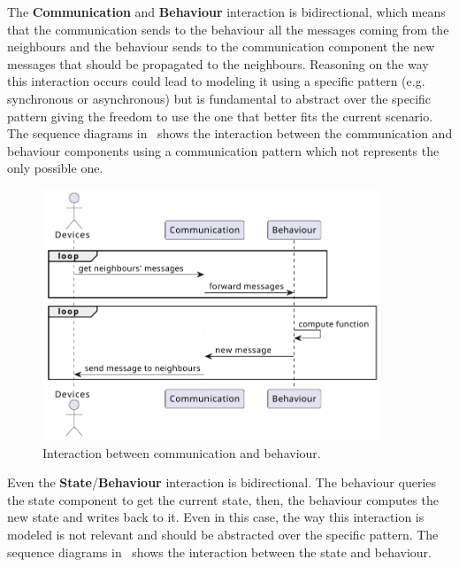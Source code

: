 The \textbf{Communication} and \textbf{Behaviour} interaction is bidirectional, which means that the communication sends to the behaviour all the
messages coming from the neighbours and the behaviour sends to the communication component the new messages that should be propagated
to the neighbours.
Reasoning on the way this interaction occurs could lead to modeling it using a specific pattern (e.g. synchronous or asynchronous) but is fundamental
to abstract over the specific pattern giving the freedom to use the one that better fits the current scenario.
The sequence diagrams in~ shows the interaction between the communication and
behaviour components using a communication pattern which not represents the only possible one.

\begin{figure}[ht]
	\centering
	\includegraphics[width=0.9\textwidth]{figures/sequence-diagram-comm.pdf}
	\caption{Interaction between communication and behaviour.}
	\label{fig:framework-components-interaction-2-communication-behaviour}
\end{figure}

Even the \textbf{State}/\textbf{Behaviour} interaction is bidirectional.
The behaviour queries the state component to get the current state, then, the behaviour computes the new state and writes back to it.
Even in this case, the way this interaction is modeled is not relevant and should be abstracted over the specific pattern.
The sequence diagrams in~ shows the interaction between the state and behaviour.

